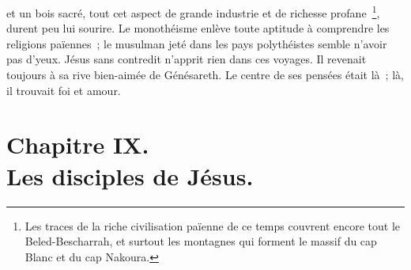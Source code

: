 \documentclass[french,twoside]{book} %
\newcommand\chapteropen{} %
\newcommand\chapterclose{} %
\begin{document}
et un bois sacré, tout cet aspect de grande industrie et de richesse profane \footnote{Les traces de la riche civilisation païenne de ce temps couvrent encore tout le Beled-Bescharrah, et surtout les montagnes qui forment le massif du cap Blanc et du cap Nakoura.}, durent peu lui sourire. Le monothéisme enlève toute aptitude à comprendre les religions païennes ; le musulman jeté dans les pays polythéistes semble n’avoir pas d’yeux. Jésus sans contredit n’apprit rien dans ces voyages. Il revenait toujours à sa rive bien-aimée de Génésareth. Le centre de ses pensées était là ; là, il trouvait foi et amour.
\chapterclose


\chapteropen
\chapter[{Chapitre IX. Les disciples de Jésus.}]{Chapitre IX.\\
Les disciples de Jésus.}\renewcommand{\leftmark}{Chapitre IX.\\
Les disciples de Jésus.}
\end{document}
